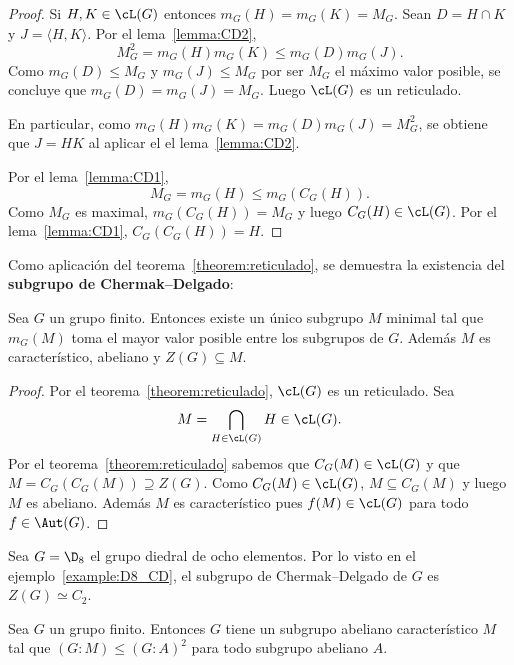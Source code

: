 \begin{proof}
	Si $H,K\in\cL(G)$ entonces $m_G(H)=m_G(K)=M_G$. Sean $D=H\cap K$ y $J=\langle
	H,K\rangle$. Por el lema~\ref{lemma:CD2}, 
	\[
		M_G^2=m_G(H)m_G(K)\leq m_G(D)m_G(J).
	\]
	Como $m_G(D)\leq M_G$ y $m_G(J)\leq M_G$ por ser $M_G$ el máximo valor posible,
	se concluye que $m_G(D)=m_G(J)=M_G$. Luego $\cL(G)$ es un reticulado. 

	En particular, como $m_G(H)m_G(K)=m_G(D)m_G(J)=M_G^2$, se obtiene que 
	$J=HK$ al aplicar el  
	el lema~\ref{lemma:CD2}.

	Por el lema~\ref{lemma:CD1}, 
	\[
	M_G=m_G(H)\leq m_G(C_G(H)).
	\]
	Como $M_G$ es maximal, $m_G(C_G(H))=M_G$ y luego $C_G(H)\in\cL(G)$.  Por el
	lema~\ref{lemma:CD1}, $C_G(C_G(H))=H$.
\end{proof}

Como aplicación del teorema~\ref{theorem:reticulado}, se demuestra la
existencia del \textbf{subgrupo de Chermak--Delgado}:

\begin{corollary}
	\label{corollary:ChermakDelgado}
	Sea $G$ un grupo finito. Entonces existe un único subgrupo $M$ minimal tal
	que $m_G(M)$ toma el mayor valor posible entre los subgrupos de $G$. Además
	$M$ es característico, abeliano y $Z(G)\subseteq M$. 
\end{corollary}


\begin{proof}
	Por el teorema~\ref{theorem:reticulado}, $\cL(G)$ es un reticulado.
	Sea
	\[
		M=\bigcap_{H\in\cL(G)}H\in\cL(G).
	\]
	Por el teorema~\ref{theorem:reticulado} sabemos que $C_G(M)\in\cL(G)$ y que
	$M=C_G(C_G(M))\supseteq Z(G)$. Como $C_G(M)\in\cL(G)$, $M\subseteq C_G(M)$
	y luego $M$ es abeliano. Además $M$ es característico pues $f(M)\in\cL(G)$
	para todo $f\in\Aut(G)$.
\end{proof}

\begin{example}
	Sea $G=\D_8$ el grupo diedral de ocho elementos.  Por lo visto en el
	ejemplo~\ref{example:D8_CD}, el subgrupo de Chermak--Delgado de $G$ es
	$Z(G)\simeq C_2$. 
\end{example}

\begin{theorem}
	Sea $G$ un grupo finito. Entonces $G$ tiene un subgrupo abeliano
	característico $M$ tal que $(G:M)\leq (G:A)^2$ para todo subgrupo abeliano
	$A$.
	\label{theorem:ChermakDelgado}
\end{theorem}


